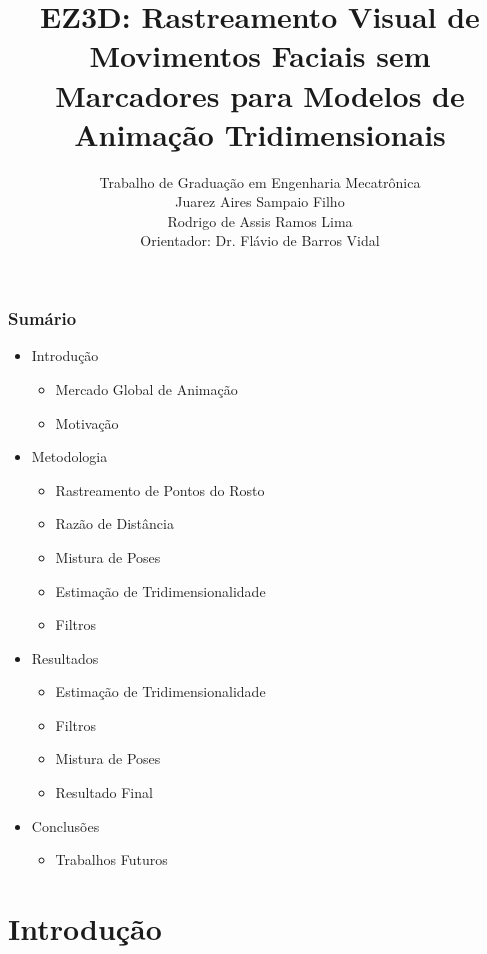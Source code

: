 \documentclass[brazil]{beamer}
\title[EZ3D]{EZ3D: Rastreamento Visual de Movimentos Faciais sem Marcadores para Modelos de Animação Tridimensionais}
\author[J. Sampaio e R. Lima]{
      Trabalho de Graduação em Engenharia Mecatrônica
      \\
        Juarez Aires Sampaio Filho \\
        Rodrigo de Assis Ramos Lima \\
        {\footnotesize Orientador: Dr. Flávio de Barros Vidal}
  }
\institute[Universidade de Brasília]{}
\date{}
\begin{document}
\begin{frame}
        \titlepage
\end{frame}

\begin{frame}[fragile]
  \frametitle{Sumário}
  \begin{itemize}
     \item Introdução
     \begin{itemize}
     	\item Mercado Global de Animação
    	 	\item Motivação
   	 \end{itemize}
     \item Metodologia
     \begin{itemize}
    	 	\item Rastreamento de Pontos do Rosto
    	 	\item Razão de Distância
    	 	\item Mistura de Poses
    	 	\item Estimação de Tridimensionalidade
    	 	\item Filtros
   	 \end{itemize}
     \item Resultados
     \begin{itemize}
    	 	\item Estimação de Tridimensionalidade
    	 	\item Filtros
    	 	\item Mistura de Poses
    	 	\item Resultado Final
   	 \end{itemize}
     \item Conclusões
     \begin{itemize}
    	 	\item Trabalhos Futuros
   	 \end{itemize}
  \end{itemize}
\end{frame}


\section{Introdução}
%
%
%
%
\end{document}
